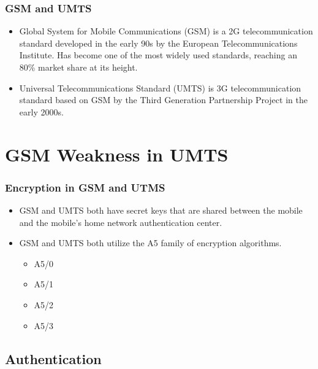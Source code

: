 \documentclass{beamer}
\begin{document}
		\begin{frame}
		\frametitle{GSM and UMTS}
		\begin{itemize}
		\item Global System for Mobile Communications (GSM) is a 2G telecommunication standard developed in the early 90s by the European Telecommunications Institute. Has become one of the most widely used standards, reaching an 80\% market share at its height.
					
		
		\item Universal Telecommunications Standard (UMTS) is 3G telecommunication standard based on GSM by the Third Generation Partnership Project in the early 2000s.   
		\end{itemize}
	\end{frame}

	
\section{GSM Weakness in UMTS}

	

	\begin{frame}
	\frametitle{Encryption in GSM and UTMS}
	\begin{itemize}
	
	
		\item GSM and UMTS both have secret keys that are shared between the mobile and the mobile's home network authentication center.
		
		\item GSM and UMTS both utilize the A5 family of encryption algorithms. 
		 \begin{itemize}
			\item A5/0 
			\item A5/1
			\item A5/2
			\item A5/3 
		\end{itemize}
		\end{itemize}
	\end{frame}
	
\subsection{Authentication}
\end{document}
